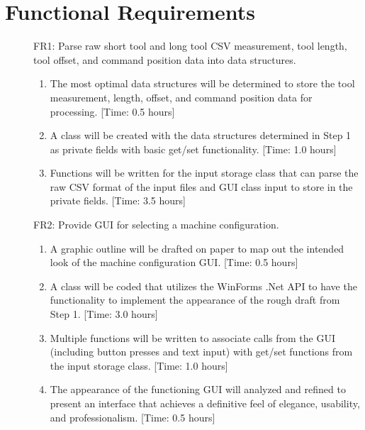 \documentclass[pdftex,10pt,a4paper]{article}
\begin{document}
\section*{Functional Requirements}
\begin{description}

\item[] FR1: Parse raw short tool and long tool CSV measurement, tool length, tool offset, and command position data into data structures. 
\begin{enumerate}
\item The most optimal data structures will be determined to store the tool measurement, length, offset, and command position data for processing. [Time: 0.5 hours]
\item A class will be created with the data structures determined in Step 1 as private fields with basic get/set functionality. [Time: 1.0 hours]
\item Functions will be written for the input storage class that can parse the raw CSV format of the input files and GUI class input to store in the private fields. [Time: 3.5 hours]
\end{enumerate}

\item[] FR2: Provide GUI for selecting a machine configuration. 
\begin{enumerate}
\item A graphic outline will be drafted on paper to map out the intended look of the machine configuration GUI. [Time: 0.5 hours]
\item A class will be coded that utilizes the WinForms .Net API to have the functionality to implement the appearance of the rough draft from Step 1. [Time: 3.0 hours]
\item Multiple functions will be written to associate calls from the GUI (including button presses and text input) with get/set functions from the input storage class. [Time: 1.0 hours]
\item The appearance of the functioning GUI will analyzed and refined to present an interface that achieves a definitive feel of elegance, usability, and professionalism. [Time: 0.5 hours]
\end{enumerate}


\end{description}
\end{document}
